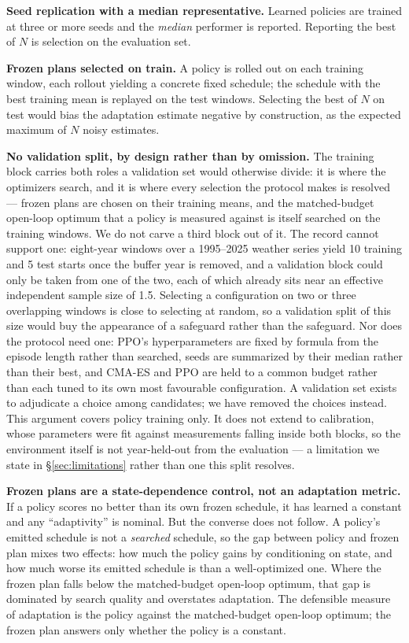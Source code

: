 \documentclass[a4paper,fleqn]{cas-sc}
\begin{document}
\textbf{Seed replication with a median representative.} Learned policies are trained at
three or more seeds and the \emph{median} performer is reported. Reporting the best of
$N$ is selection on the evaluation set.

\textbf{Frozen plans selected on train.} A policy is rolled out on each training window,
each rollout yielding a concrete fixed schedule; the schedule with the best training
mean is replayed on the test windows. Selecting the best of $N$ on test would bias the
adaptation estimate negative by construction, as the expected maximum of $N$ noisy
estimates.

\textbf{No validation split, by design rather than by omission.} The training block
carries both roles a validation set would otherwise divide: it is where the optimizers
search, and it is where every selection the protocol makes is resolved --- frozen plans
are chosen on their training means, and the matched-budget open-loop optimum that a
policy is measured against is itself searched on the training windows. We do not carve a
third block out of it. The record cannot support one: eight-year windows over a
1995--2025 weather series yield 10 training and 5 test starts once the buffer year is
removed, and a validation block could only be taken from one of the two, each of which
already sits near an effective independent sample size of 1.5. Selecting a configuration
on two or three overlapping windows is close to selecting at random, so a validation
split of this size would buy the appearance of a safeguard rather than the safeguard.
Nor does the protocol need one: PPO's hyperparameters are fixed by formula from the
episode length rather than searched, seeds are summarized by their median rather than
their best, and CMA-ES and PPO are held to a common budget rather than each tuned to its
own most favourable configuration. A validation set exists to adjudicate a choice among
candidates; we have removed the choices instead. This argument covers policy training
only. It does not extend to calibration, whose parameters were fit against measurements
falling inside both blocks, so the environment itself is not year-held-out from the
evaluation --- a limitation we state in \S\ref{sec:limitations} rather than one this
split resolves.

\textbf{Frozen plans are a state-dependence control, not an adaptation metric.} If a
policy scores no better than its own frozen schedule, it has learned a constant and any
``adaptivity'' is nominal. But the converse does not follow. A policy's emitted schedule
is not a \emph{searched} schedule, so the gap between policy and frozen plan mixes two
effects: how much the policy gains by conditioning on state, and how much worse its
emitted schedule is than a well-optimized one. Where the frozen plan falls below the
matched-budget open-loop optimum, that gap is dominated by search quality and overstates
adaptation. The defensible measure of adaptation is the policy against the
matched-budget open-loop optimum; the frozen plan answers only whether the policy is a
constant.
\end{document}
